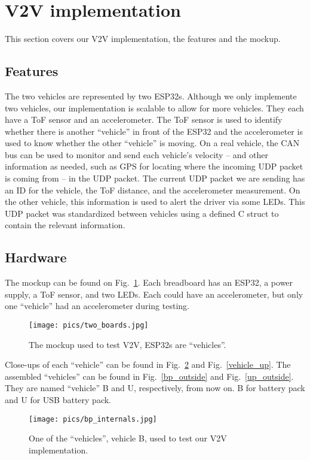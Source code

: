 \documentclass[conference]{IEEEtran}
\begin{document}
\section{V2V implementation}
This section covers our V2V implementation, the features and the mockup.

\subsection{Features}
The two vehicles are represented by two ESP32s. Although we only implemente two vehicles,
our implementation is scalable to allow for more vehicles. They each have a ToF sensor and
an accelerometer. The ToF sensor is used to identify whether there is another
``vehicle'' in front of the ESP32 and the accelerometer is used to know whether
the other ``vehicle'' is moving. On a real vehicle, the CAN bus can be used to
monitor and send each vehicle's velocity -- and other information as needed,
such as GPS for locating where the incoming UDP packet is coming from -- in the
UDP packet. The current UDP packet we are sending has an ID for the vehicle, the
ToF distance, and the accelerometer measurement. On the other vehicle, this
information is used to alert the driver via some LEDs. This UDP packet was standardized
between vehicles using a defined C struct to contain the relevant information.

\subsection{Hardware}
The mockup can be found on Fig.~\ref{mockup}. Each breadboard has an ESP32, a
power supply, a ToF sensor, and two LEDs. Each could have an accelerometer, but
only one ``vehicle'' had an accelerometer during testing.

\begin{figure}[htbp]
\centerline{\texttt{[image: pics/two\_boards.jpg]}}
\caption{The mockup used to test V2V, ESP32s are ``vehicles''.}
\label{mockup}
\end{figure}

Close-ups of each ``vehicle'' can be found in Fig.~\ref{vehicle_bp} and
Fig.~\ref{vehicle_up}. The assembled ``vehicles'' can be found in
Fig.~\ref{bp_outside} and Fig.~\ref{up_outside}. They are named ``vehicle'' B
and U, respectively, from now on. B for battery pack and U for USB battery pack.

\begin{figure}[htbp]
\centerline{\texttt{[image: pics/bp\_internals.jpg]}}
\caption{One of the ``vehicles'', vehicle B, used to test our V2V implementation.}
\label{vehicle_bp}
\end{figure}
\end{document}
